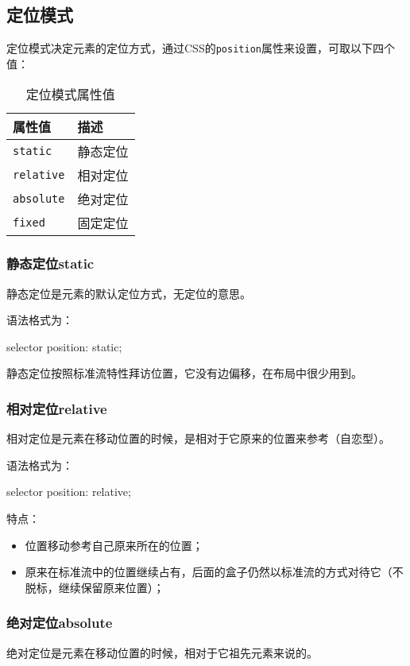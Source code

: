 \subsection{定位模式}
定位模式决定元素的定位方式，通过CSS的\verb|position|属性来设置，可取以下四个值：
\begin{table}[H]
	\centering
	\caption{定位模式属性值}
	\label{positioning mode}
	\begin{tabular}{ll}
		\hline
		属性值             & 描述   \\
		\hline
		\verb|static|   & 静态定位 \\
		\verb|relative| & 相对定位 \\
		\verb|absolute| & 绝对定位 \\
		\verb|fixed|    & 固定定位 \\
		\hline
	\end{tabular}
\end{table}
\subsubsection{静态定位static}
静态定位是元素的默认定位方式，无定位的意思。

语法格式为：
\begin{css}
	selector {
	position: static;
	}
\end{css}

静态定位按照标准流特性拜访位置，它没有边偏移，在布局中很少用到。

\subsubsection{相对定位relative}
相对定位是元素在移动位置的时候，是相对于它原来的位置来参考（自恋型）。

语法格式为：
\begin{css}
	selector {
	position: relative;
	}
\end{css}

特点：
\begin{itemize}
	\item 位置移动参考自己原来所在的位置；
	\item 原来在标准流中的位置继续占有，后面的盒子仍然以标准流的方式对待它（不脱标，继续保留原来位置）；
\end{itemize}
\subsubsection{绝对定位absolute}
绝对定位是元素在移动位置的时候，相对于它祖先元素来说的。

